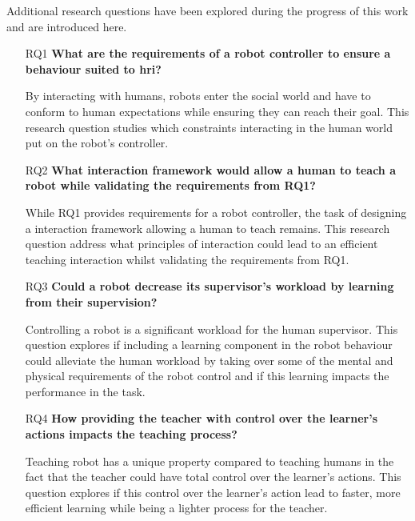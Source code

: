 Additional research questions have been explored during the progress of this
work and are introduced here.
\begin{itemize}
	\item [RQ1] \textbf{What are the requirements of a robot controller to ensure a behaviour suited to \gls{hri}?} 
	
		By interacting with humans, robots enter the social world and have to conform to human expectations while ensuring they can reach their goal. This research question studies which constraints interacting in the human world put on the robot's controller. 
		
    \item [RQ2] \textbf{What interaction framework would allow a human to teach a robot while validating the requirements from RQ1?}
    
    	While RQ1 provides requirements for a robot controller, the task of designing a interaction framework allowing a human to teach remains. This research question address what principles of interaction could lead to an efficient teaching interaction whilst validating the requirements from RQ1. 
    	
    \item [RQ3] \textbf{Could a robot decrease its supervisor's workload by learning from their supervision?}
    
        Controlling a robot is a significant workload for the human supervisor. This question explores if including a learning component in the robot behaviour could alleviate the human workload by taking over some of the mental and physical requirements of the robot control and if this learning impacts the performance in the task.
    
    \item [RQ4] \textbf{How providing the teacher with control over the learner's actions impacts the teaching process?} 
    
    	Teaching robot has a unique property compared to teaching humans in the fact that the teacher could have total control over the learner's actions. This question explores if this control over the learner's action lead to faster, more efficient learning while being a lighter process for the teacher.


\end{itemize}
